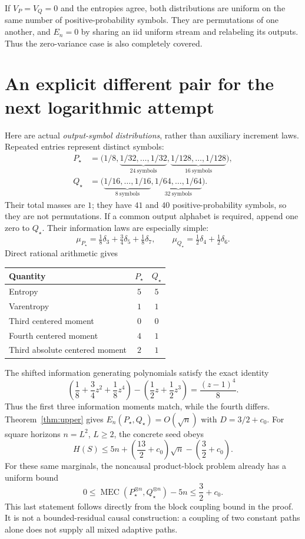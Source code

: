 \documentclass[11pt,a4paper]{article}
\newcommand{\MEC}{\operatorname{MEC}}
\newcommand{\cst}{c_0}
\begin{document}
If $V_P=V_Q=0$ and the entropies agree, both distributions are uniform
on the same number of positive-probability symbols. They are permutations
of one another, and $E_n=0$ by sharing an iid uniform stream and relabeling
its outputs. Thus the zero-variance case is also completely covered.

\section{An explicit different pair for the next logarithmic attempt}
Here are actual \emph{output-symbol distributions}, rather than auxiliary
increment laws. Repeated entries represent distinct symbols:
\begin{align*}
P_\star&=\bigl(1/8,\underbrace{1/32,\ldots,1/32}_{24\ \mathrm{symbols}},
                  \underbrace{1/128,\ldots,1/128}_{16\ \mathrm{symbols}}\bigr),\\
Q_\star&=\bigl(\underbrace{1/16,\ldots,1/16}_{8\ \mathrm{symbols}},
                  \underbrace{1/64,\ldots,1/64}_{32\ \mathrm{symbols}}\bigr).
\end{align*}
Their total masses are $1$; they have $41$ and $40$ positive-probability
symbols, so they are not permutations. If a common output alphabet is
required, append one zero to $Q_\star$.
Their information laws are especially simple:
\[
\mu_{P_\star}=\tfrac18\delta_3+\tfrac34\delta_5+\tfrac18\delta_7,
\qquad
\mu_{Q_\star}=\tfrac12\delta_4+\tfrac12\delta_6.
\]
Direct rational arithmetic gives
\begin{center}
\begin{tabular}{lcc}
\toprule
Quantity & $P_\star$ & $Q_\star$\\
\midrule
Entropy & $5$ & $5$\\
Varentropy & $1$ & $1$\\
Third centered moment & $0$ & $0$\\
Fourth centered moment & $4$ & $1$\\
Third absolute centered moment & $2$ & $1$\\
\bottomrule
\end{tabular}
\end{center}
The shifted information generating polynomials satisfy the exact identity
\[
\left(\frac18+\frac34z^2+\frac18z^4\right)
-\left(\frac12z+\frac12z^3\right)=\frac{(z-1)^4}{8}.
\]
Thus the first three information moments match, while the fourth differs.
Theorem~\ref{thm:upper} gives $E_n(P_\star,Q_\star)=O(\sqrt n)$ with
$D=3/2+\cst$. For square horizons $n=L^2$, $L\ge2$, the concrete seed obeys
\[
H(S)\le5n+\left(\frac{13}{2}+\cst\right)\sqrt n
             -\left(\frac32+\cst\right).
\]
For these same marginals, the noncausal product-block problem already has
a uniform bound
\[
0\le \MEC(P_\star^{\otimes n},Q_\star^{\otimes n})-5n
\le \frac32+\cst.
\]
This last statement follows directly from the block coupling bound in the
proof. It is not a bounded-residual causal construction: a coupling of two
constant paths alone does not supply all mixed adaptive paths.
\end{document}
